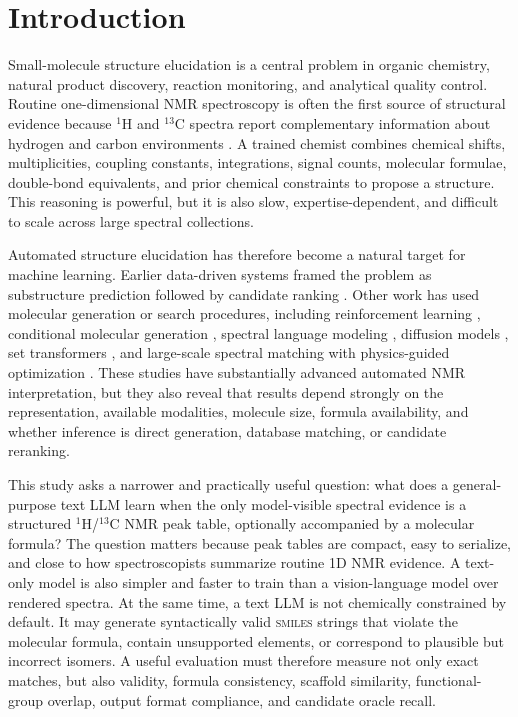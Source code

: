 \documentclass{article}
\newcommand{\smiles}{\textsc{smiles}}
\begin{document}
\section{Introduction}

Small-molecule structure elucidation is a central problem in organic chemistry, natural product discovery, reaction monitoring, and analytical quality control. Routine one-dimensional NMR spectroscopy is often the first source of structural evidence because \(^{1}\)H and \(^{13}\)C spectra report complementary information about hydrogen and carbon environments \cite{Ernst1987,Levitt2008,Silverstein2014,Claridge2016}. A trained chemist combines chemical shifts, multiplicities, coupling constants, integrations, signal counts, molecular formulae, double-bond equivalents, and prior chemical constraints to propose a structure. This reasoning is powerful, but it is also slow, expertise-dependent, and difficult to scale across large spectral collections.

Automated structure elucidation has therefore become a natural target for machine learning. Earlier data-driven systems framed the problem as substructure prediction followed by candidate ranking \cite{Huang2021,Hu2024}. Other work has used molecular generation or search procedures, including reinforcement learning \cite{Sridharan2022,Devata2024}, conditional molecular generation \cite{Yao2023}, spectral language modeling \cite{Alberts2023,Alberts2025}, diffusion models \cite{Xiong2025,Yang2025}, set transformers \cite{Yang2026}, and large-scale spectral matching with physics-guided optimization \cite{Jin2026}. These studies have substantially advanced automated NMR interpretation, but they also reveal that results depend strongly on the representation, available modalities, molecule size, formula availability, and whether inference is direct generation, database matching, or candidate reranking.

This study asks a narrower and practically useful question: what does a general-purpose text LLM learn when the only model-visible spectral evidence is a structured \(^{1}\)H/\(^{13}\)C NMR peak table, optionally accompanied by a molecular formula? The question matters because peak tables are compact, easy to serialize, and close to how spectroscopists summarize routine 1D NMR evidence. A text-only model is also simpler and faster to train than a vision-language model over rendered spectra. At the same time, a text LLM is not chemically constrained by default. It may generate syntactically valid \smiles{} strings that violate the molecular formula, contain unsupported elements, or correspond to plausible but incorrect isomers. A useful evaluation must therefore measure not only exact matches, but also validity, formula consistency, scaffold similarity, functional-group overlap, output format compliance, and candidate oracle recall.
\end{document}
